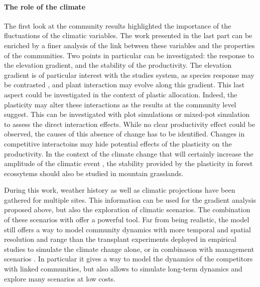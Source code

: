 \paragraph{The role of the climate}

The first look at the community results highlighted the importance of the fluctuations of the climatic variables. The work presented in the last part can be enriched by a finer analysis of the link between these variables and the properties of the communities. Two points in particular can be investigated: the response to the elevation gradient, and the stability of the productivity. The elevation gradient is of particular interest with the studies system, as species response may be contrasted  \parencite{kichenin_contrasting_2013}, and plant interaction may evolve \parencite{choler_facilitation_2001, callaway_positive_2002} along this gradient. This last aspect could be investigated in the context of plastic allocation. Indeed, the plasticity may alter these interactions as the results at the community level suggest. This can be investigated with plot simulations or mixed-pot simulation to assess the direct interaction effects. While no clear productivity effect could be observed, the causes of this absence of change has to be identified. Changes in competitive interactoins may hide potential effects of the plasticity on the productivity. In the context of the climate change that will certainly increase the amplitude of the climatic event \cite{gobiet_21st_2014}, the stability provided by the plasticity in forest ecossytems \parencite{morin_temporal_2014} should also be studied in mountain grasslands.

During this work, weather history as well as climatic projections have been gathered for multiple sites. This information can be used for the gradient analysis proposed above, but also the exploration of climatic scenarios. The combination of these scenarios \parencite{intergovernmental_panel_on_climate_change_climate_2014} with \model offer a powerful tool. Far from being realistic, the model still offers a way to model community dynamics with more temporal and spatial resolution and range than the transplant experiments deployed in empirical studies \parencite{ishizuka_modeling_2012, wang_asymmetric_2014, grassein_importance_2014, hamann_evidence_2016} to simulate the climate change alone, or in combinason with management scenarios \parencite{deleglise_drought-induced_2015}. In particular it gives a way to model the dynamics of the competitors \parencite{alexander_novel_2015} with linked communities, but also allows to simulate long-term dynamics and explore many scenarios at low costs.

